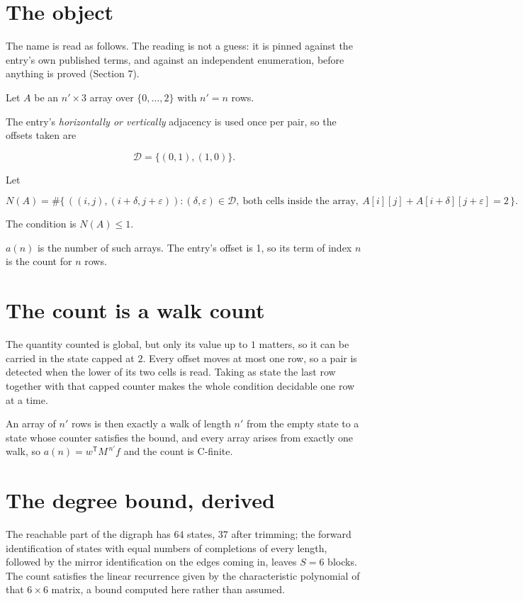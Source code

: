 \documentclass[11pt]{article}
\theoremstyle{definition}
\begin{document}
\section{The object}

The name is read as follows. The reading is not a guess: it is pinned against the entry's own published terms, and against an independent enumeration, before anything is proved (Section 7).

Let $A$ be an $n' \times 3$ array over $\{0,\dots,2\}$ with $n' = n$ rows.

The entry's {\itshape horizontally or vertically} adjacency is used once per pair, so the offsets taken are

\[\mathcal{D} = \{(0,1), (1,0)\}.\]

Let

\[N(A) = \#\bigl\{\,((i,j),(i{+}\delta,j{+}\varepsilon)) : (\delta,\varepsilon) \in \mathcal{D},\ \text{both cells inside the array},\ A[i][j] + A[i{+}\delta][j{+}\varepsilon] = 2\,\bigr\}.\]

The condition is $N(A) \le 1$.

$a(n)$ is the number of such arrays. The entry's offset is 1, so its term of index $n$ is the count for $n$ rows.

\section{The count is a walk count}

The quantity counted is global, but only its value up to $1$ matters, so it can be carried in the state capped at $2$. Every offset moves at most one row, so a pair is detected when the lower of its two cells is read. Taking as state the last row together with that capped counter makes the whole condition decidable one row at a time.

An array of $n'$ rows is then exactly a walk of length $n'$ from the empty state to a state whose counter satisfies the bound, and every array arises from exactly one walk, so $a(n) = w^{\mathsf T}M^{\,n'}f$ and the count is C-finite.

\section{The degree bound, derived}

The reachable part of the digraph has $64$ states, $37$ after trimming; the forward identification of states with equal numbers of completions of every length, followed by the mirror identification on the edges coming in, leaves $S = 6$ blocks. The count satisfies the linear recurrence given by the characteristic polynomial of that $6\times6$ matrix, a bound computed here rather than assumed.
\end{document}

